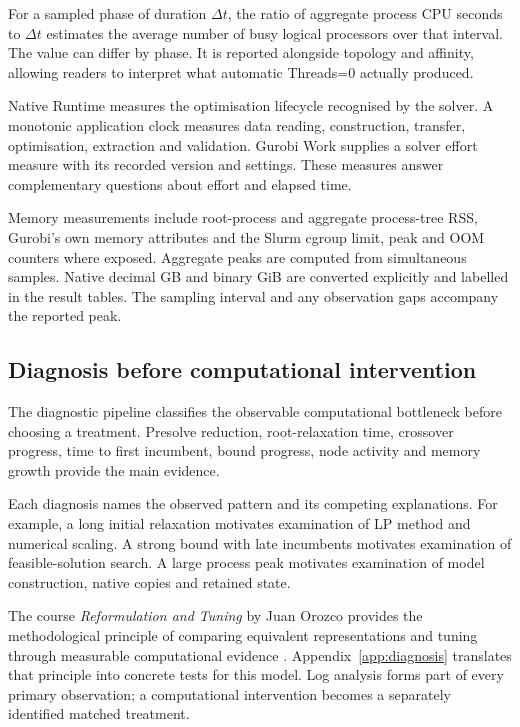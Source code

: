 \documentclass[11pt,a4paper]{article}
\begin{document}
For a sampled phase of duration $\Delta t$, the ratio of aggregate process CPU seconds to $\Delta t$ estimates the average number of busy logical processors over that interval. The value can differ by phase. It is reported alongside topology and affinity, allowing readers to interpret what automatic Threads=0 actually produced.

Native Runtime measures the optimisation lifecycle recognised by the solver. A monotonic application clock measures data reading, construction, transfer, optimisation, extraction and validation. Gurobi Work supplies a solver effort measure with its recorded version and settings. These measures answer complementary questions about effort and elapsed time.

Memory measurements include root-process and aggregate process-tree RSS, Gurobi's own memory attributes and the Slurm cgroup limit, peak and OOM counters where exposed. Aggregate peaks are computed from simultaneous samples. Native decimal GB and binary GiB are converted explicitly and labelled in the result tables. The sampling interval and any observation gaps accompany the reported peak.

\subsection{Diagnosis before computational intervention}

The diagnostic pipeline classifies the observable computational bottleneck before choosing a treatment. Presolve reduction, root-relaxation time, crossover progress, time to first incumbent, bound progress, node activity and memory growth provide the main evidence.

Each diagnosis names the observed pattern and its competing explanations. For example, a long initial relaxation motivates examination of LP method and numerical scaling. A strong bound with late incumbents motivates examination of feasible-solution search. A large process peak motivates examination of model construction, native copies and retained state.

The course \emph{Reformulation and Tuning} by Juan Orozco provides the methodological principle of comparing equivalent representations and tuning through measurable computational evidence \citep{orozco}. Appendix~\ref{app:diagnosis} translates that principle into concrete tests for this model. Log analysis forms part of every primary observation; a computational intervention becomes a separately identified matched treatment.
\end{document}
